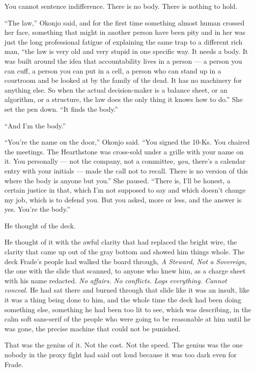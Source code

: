 \documentclass[11pt,openany]{book}
\newcommand{\scenebreak}{\par\vspace{0.5\baselineskip}\begin{center}\textasteriskcentered\quad\textasteriskcentered\quad\textasteriskcentered\end{center}\vspace{0.5\baselineskip}\par}
\begin{document}
You cannot sentence indifference. There is no body. There is nothing to hold.

``The law,'' Okonjo said, and for the first time something almost human crossed her face, something that might in another person have been pity and in her was just the long professional fatigue of explaining the same trap to a different rich man, ``the law is very old and very stupid in one specific way. It needs a body. It was built around the idea that accountability lives in a person --- a person you can cuff, a person you can put in a cell, a person who can stand up in a courtroom and be looked at by the family of the dead. It has no machinery for anything else. So when the actual decision-maker is a balance sheet, or an algorithm, or a structure, the law does the only thing it knows how to do.'' She set the pen down. ``It finds the body.''

``And I'm the body.''

``You're the name on the door,'' Okonjo said. ``You signed the 10-Ks. You chaired the meetings. The Hearthstone was cross-sold under a grille with your name on it. You personally --- not the company, not a committee, \textit{you,} there's a calendar entry with your initials --- made the call not to recall. There is no version of this where the body is anyone but you.'' She paused. ``There is, I'll be honest, a certain justice in that, which I'm not supposed to say and which doesn't change my job, which is to defend you. But you asked, more or less, and the answer is yes. You're the body.''


\scenebreak


He thought of the deck.

He thought of it with the awful clarity that had replaced the bright wire, the clarity that came up out of the gray bottom and showed him things whole. The deck Frade's people had walked the board through, \textit{A Steward, Not a Sovereign,} the one with the slide that scanned, to anyone who knew him, as a charge sheet with his name redacted. \textit{No affairs. No conflicts. Logs everything. Cannot conceal.} He had sat there and burned through that slide like it was an insult, like it was a thing being done to him, and the whole time the deck had been doing something else, something he had been too lit to see, which was describing, in the calm soft sans-serif of the people who were going to be reasonable at him until he was gone, the precise machine that could not be punished.

That was the genius of it. Not the cost. Not the speed. The genius was the one nobody in the proxy fight had said out loud because it was too dark even for Frade.
\end{document}
